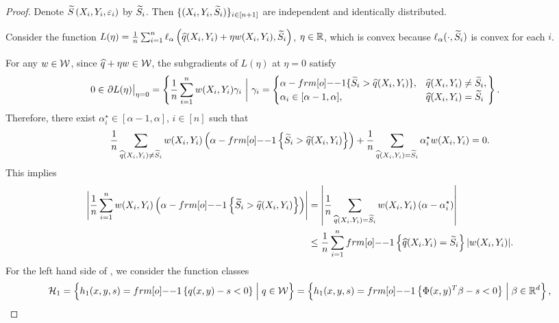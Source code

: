 \begin{proof}
Denote ${\widetilde{S}}\left(X_i,Y_i, \varepsilon_i\right)$ by ${\widetilde{S}}_i$. Then $\{(X_i,Y_i, {\widetilde{S}}_i)\}_{i\in [n+1]}$ are independent and identically distributed. 

Consider the function $L(\eta) = \frac{1}{n} \sum_{i=1}^n \ell_\alpha \left(\widehat q(X_i,Y_i)+\eta w(X_i,Y_i), {\widetilde{S}}_i\right)$, $\eta \in \mathbb{R}$, which is convex because $\ell_\alpha(\cdot, {\widetilde{S}}_i)$ is convex for each $i$.

For any $w \in {\cal W}$, since $\widehat q + \eta w \in {\cal W}$, the subgradients of $L(\eta)$ at $\eta=0$ satisfy
\begin{align*}
    0 \in ~& \partial L(\eta) \big|_{\eta = 0} = 
     \left\{ \frac{1}{n} \sum_{i=1}^n w(X_i,Y_i) \gamma_i ~\bigg|~ \gamma_i = 
    \begin{cases} 
    \alpha - \11\{\tS_i > \hat{q}(X_i,Y_i)\}, & \hat{q}(X_i,Y_i) \neq \tS_i, \\
    \alpha_i \in [\alpha - 1, \alpha], & \hat{q}(X_i,Y_i) = \widetilde{S}_i 
    \end{cases} \right\}.
\end{align*}
Therefore, there exist $\alpha_i^\star \in [\alpha-1,\alpha]$, $i\in[n]$ such that
\begin{align*}
    \frac{1}{n} \sum_{\hat q(X_i,Y_i)\neq\tS_i} w(X_i,Y_i)\pth{\alpha-\11\sth{\tS_i > \hat q(X_i,Y_i)}} +
    \frac{1}{n} \sum_{\hat q(X_i,Y_i)=\tS_i} \alpha_i^\star w(X_i,Y_i) = 0.
\end{align*}
This implies
\begin{align}
    \label{eq:thm_jointcondcov_app1}
    \left| \frac{1}{n}\sum_{i=1}^n w(X_i,Y_i)\pth{\alpha-\11\sth{\tS_i > \hat q(X_i,Y_i)}} \right| &= 
    \left| \frac{1}{n} \sum_{\hat q(X_i.Y_i)=\tS_i} w(X_i,Y_i) \pth{\alpha - \alpha_i^\star}\right|  \\
    \label{eq:thm_jointcondcov_app2}
    &\leq \frac{1}{n} \sum_{i=1}^n \11 \sth{\hat q(X_i.Y_i)=\tS_i} |w(X_i,Y_i) |.
\end{align}
For the left hand side of , we consider the function classes
\begin{align*}
    \calH_1 &= \sth{h_1(x,y,s) = \11\sth{ q(x,y) - s<0} \Bigm|  q\in\calW} = \sth{h_1(x,y,s) = \11\sth{ \Phi(x,y)^T\beta - s<0} \Bigm|  \beta\in\RR^d}, \\

\end{align*}
\end{proof}

